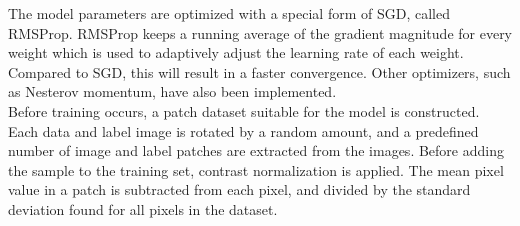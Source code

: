 The model parameters are optimized with a special form of \ac{SGD}, called RMSProp. RMSProp keeps a running average of the gradient magnitude for every weight which is used to adaptively adjust the learning rate of each weight. Compared to \ac{SGD}, this will result in a faster convergence. Other optimizers, such as Nesterov momentum, have also been implemented.\\ 

Before training occurs, a patch dataset suitable for the model is constructed. Each data and label image is rotated by a random amount, and a predefined number of image and label patches are extracted from the images. Before adding the sample to the training set, contrast normalization is applied. The mean pixel value in a patch is subtracted from each pixel, and divided by the standard deviation found for all pixels in the dataset.\\

